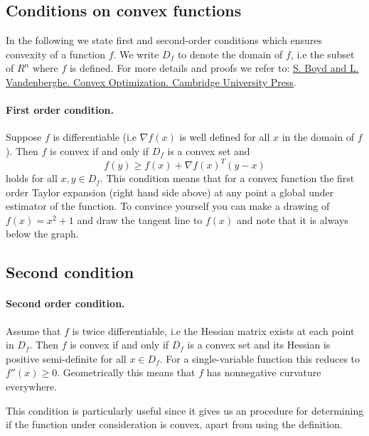 \documentclass[%
oneside,                 %
final,                   %
10pt]{article}
\begin{document}
\subsection*{Conditions on convex functions}

In the following we state first and second-order conditions which
ensures convexity of a function $f$. We write $D_f$ to denote the
domain of $f$, i.e the subset of $R^n$ where $f$ is defined. For more
details and proofs we refer to: \href{{http://stanford.edu/boyd/cvxbook/, 2004}}{S. Boyd and L. Vandenberghe. Convex Optimization. Cambridge University Press}.


\paragraph{First order condition.}
Suppose $f$ is differentiable (i.e $\nabla f(x)$ is well defined for
all $x$ in the domain of $f$). Then $f$ is convex if and only if $D_f$
is a convex set and $$f(y) \geq f(x) + \nabla f(x)^T (y-x) $$ holds
for all $x,y \in D_f$. This condition means that for a convex function
the first order Taylor expansion (right hand side above) at any point
a global under estimator of the function. To convince yourself you can
make a drawing of $f(x) = x^2+1$ and draw the tangent line to $f(x)$ and
note that it is always below the graph.



\subsection*{Second condition}


\paragraph{Second order condition.}
Assume that $f$ is twice
differentiable, i.e the Hessian matrix exists at each point in
$D_f$. Then $f$ is convex if and only if $D_f$ is a convex set and its
Hessian is positive semi-definite for all $x\in D_f$. For a
single-variable function this reduces to $f''(x) \geq 0$. Geometrically this means that $f$ has nonnegative curvature
everywhere.



This condition is particularly useful since it gives us an procedure for determining if the function under consideration is convex, apart from using the definition.
\end{document}
